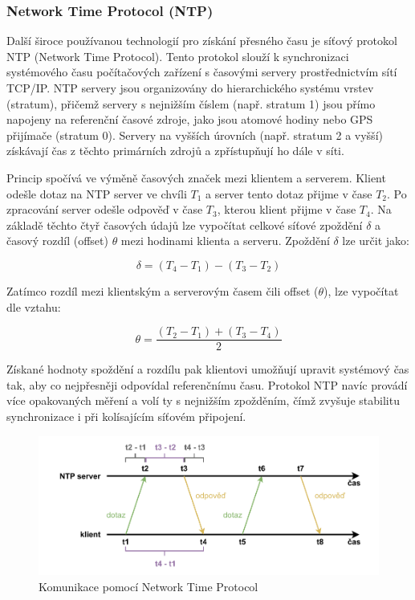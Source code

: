 \subsubsection{Network Time Protocol (NTP)}
Další široce používanou technologií pro získání přesného času je síťový protokol NTP (Network Time Protocol). Tento protokol slouží k synchronizaci systémového času počítačových zařízení s časovými servery prostřednictvím sítí TCP/IP. NTP servery jsou organizovány do hierarchického systému vrstev (stratum), přičemž servery s nejnižším číslem (např. stratum 1) jsou přímo napojeny na referenční časové zdroje, jako jsou atomové hodiny nebo GPS přijímače (stratum 0). Servery na vyšších úrovních (např. stratum 2 a vyšší) získávají čas z těchto primárních zdrojů a zpřístupňují ho dále v síti.

Princip spočívá ve výměně časových značek mezi klientem a serverem. Klient odešle dotaz na NTP server ve chvíli $T_1$ a server tento dotaz přijme v čase $T_2$. Po zpracování server odešle odpověď v čase $T_3$, kterou klient přijme v čase $T_4$. Na základě těchto čtyř časových údajů lze vypočítat celkové síťové zpoždění $\delta$ a časový rozdíl (offset) $\theta$ mezi hodinami klienta a serveru. Zpoždění $\delta$ lze určit jako:

\begin{equation}
    \delta = (T_4 - T_1) - (T_3 - T_2)
    \label{eq:ntp_delay}
\end{equation}
    

Zatímco rozdíl mezi klientským a serverovým časem čili offset ($\theta$), lze vypočítat dle vztahu:

\begin{equation}
    \theta = \frac{(T_2 - T_1) + (T_3 - T_4)}{2}
    \label{eq:ntp_offset}
\end{equation}

Získané hodnoty spoždění a rozdílu pak klientovi umožňují upravit systémový čas tak, aby co nejpřesněji odpovídal referenčnímu času. Protokol NTP navíc provádí více opakovaných měření a volí ty s nejnižším zpožděním, čímž zvyšuje stabilitu synchronizace i při kolísajícím síťovém připojení. \cite{sookocheff_ntp}

\begin{figure}[h]
    \centering
    \includegraphics[width=1.00\textwidth]{obrazky-figures/network_time_protocol.pdf}
    
    \caption{Komunikace pomocí Network Time Protocol \cite{sookocheff_ntp}}
    \label{fig:network-time-protocol}
\end{figure}

